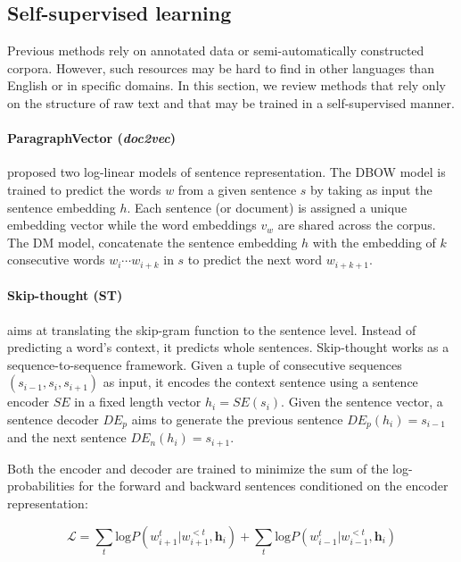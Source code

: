 \subsection{Self-supervised learning}

Previous methods rely on annotated data or semi-automatically constructed corpora. However, such resources may be hard to find in other languages than English or in specific domains. In this section, we review methods that rely only on the structure of raw text and that may be trained in a self-supervised manner. 

\paragraph{ParagraphVector (\textsl{doc2vec})} \textcite{le_14} proposed two log-linear models of sentence representation. The DBOW model is trained to predict the words $w$ from a given sentence $s$ by taking as input the sentence embedding $h$. Each sentence (or document) is assigned a unique embedding vector while the word embeddings $v_w$ are shared across the corpus. The DM model, concatenate the sentence embedding $h$ with the embedding of $k$ consecutive words $w_i \cdots w_{i+k}$ in $s$ to predict the next word $w_{i+k+1}$.

\paragraph{Skip-thought (ST)} \textcite{kiros_15} aims at translating the skip-gram function to the sentence level. Instead of predicting a word's context, it predicts whole sentences. Skip-thought works as a sequence-to-sequence framework. Given a tuple of consecutive sequences $(s_{i-1}, s_i, s_{i+1})$ as input, it encodes the context sentence using a sentence encoder $SE$ in a fixed length vector $h_i = SE(s_i)$. Given the sentence vector, a sentence decoder $DE_p$ aims to generate the previous sentence $DE_p(h_i) = s_{i-1}$ and the next sentence $DE_n(h_i) = s_{i+1}$.

Both the encoder and decoder are trained to minimize the sum of the log-probabilities for the forward and backward sentences conditioned on the encoder representation:

\begin{equation*}
    \mathcal{L} = \sum_t \text{log} P(w_{i+1}^t | w_{i+1}^{<t}, \textbf{h}_i) + \sum_t \text{log} P(w_{i-1}^t | w_{i-1}^{<t}, \textbf{h}_i)
\end{equation*}


